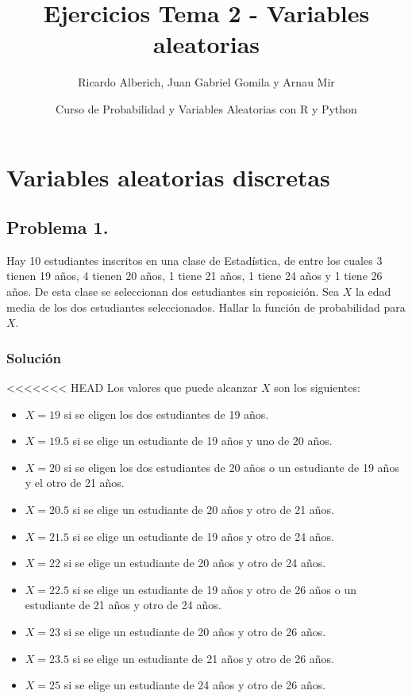 \documentclass[
]{article}
\title{Ejercicios Tema 2 - Variables aleatorias}
\author{Ricardo Alberich, Juan Gabriel Gomila y Arnau Mir}
\date{Curso de Probabilidad y Variables Aleatorias con R y Python}
\providecommand{\tightlist}{%
  \setlength{\itemsep}{0pt}\setlength{\parskip}{0pt}}
\begin{document}
\maketitle

{
\hypersetup{linkcolor=blue}
\setcounter{tocdepth}{4}
\tableofcontents
}
\hypertarget{variables-aleatorias-discretas}{%
\section{Variables aleatorias
discretas}\label{variables-aleatorias-discretas}}

\hypertarget{problema-1.}{%
\subsection{Problema 1.}\label{problema-1.}}

Hay 10 estudiantes inscritos en una clase de Estadística, de entre los
cuales 3 tienen 19 años, 4 tienen 20 años, 1 tiene 21 años, 1 tiene 24
años y 1 tiene 26 años. De esta clase se seleccionan dos estudiantes sin
reposición. Sea \(X\) la edad media de los dos estudiantes
seleccionados. Hallar la función de probabilidad para \(X\).

\hypertarget{soluciuxf3n}{%
\subsubsection{Solución}\label{soluciuxf3n}}

\textless\textless\textless\textless\textless\textless\textless{} HEAD
Los valores que puede alcanzar \(X\) son los siguientes:

\begin{itemize}
\tightlist
\item
  \(X=19\) si se eligen los dos estudiantes de 19 años.
\item
  \(X=19.5\) si se elige un estudiante de 19 años y uno de 20 años.
\item
  \(X=20\) si se eligen los dos estudiantes de 20 años o un estudiante
  de 19 años y el otro de 21 años.
\item
  \(X=20.5\) si se elige un estudiante de 20 años y otro de 21 años.
\item
  \(X=21.5\) si se elige un estudiante de 19 años y otro de 24 años.
\item
  \(X=22\) si se elige un estudiante de 20 años y otro de 24 años.
\item
  \(X=22.5\) si se elige un estudiante de 19 años y otro de 26 años o un
  estudiante de 21 años y otro de 24 años.
\item
  \(X=23\) si se elige un estudiante de 20 años y otro de 26 años.
\item
  \(X=23.5\) si se elige un estudiante de 21 años y otro de 26 años.
\item
  \(X=25\) si se elige un estudiante de 24 años y otro de 26 años.
\end{itemize}
\end{document}
